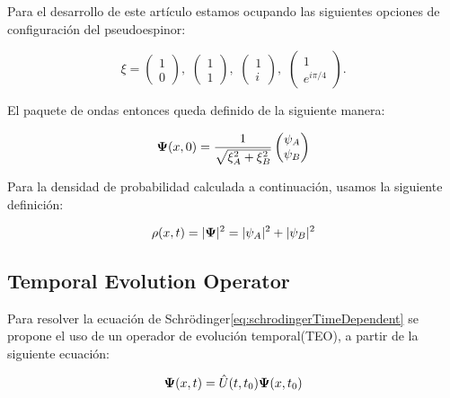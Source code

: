 Para el desarrollo de este artículo estamos ocupando las siguientes opciones de configuración del pseudoespinor:

\begin{equation}
    \label{eq:pseudospinorConfigurations}
    \xi=\begin{pmatrix}
            1\\0
    \end{pmatrix},\,\,\begin{pmatrix}
                          1\\1
    \end{pmatrix},\,\,\begin{pmatrix}
                          1\\i
    \end{pmatrix},\,\,\begin{pmatrix}
                          1\\e^{i\pi/4}
    \end{pmatrix}.
\end{equation}

El paquete de ondas entonces queda definido de la siguiente manera:

\begin{equation}
    \label{eq:FinalGWP}
    \mbox{\boldmath $\Psi$}(x,0)=\frac{1}{\sqrt {\xi_A^2 + \xi_B^2}}\begin{pmatrix}
                                                          \psi_A\\\psi_B
    \end{pmatrix}
\end{equation}

Para la densidad de probabilidad calculada a continuación, usamos la siguiente definición:

\begin{equation}
    \label{eq:probDens}
    \rho(x,t)=|\mbox{\boldmath $\Psi$}|^2 = |\psi_A|^2+|\psi_B|^2
\end{equation}

\subsection{Temporal Evolution Operator}\label{subsec:temporal-evolution-operator}
Para resolver la ecuación de Schrödinger\eqref{eq:schrodingerTimeDependent} se propone el uso de un operador de evolución temporal(TEO), a partir de la siguiente ecuación:

\begin{equation}
    \label{eq:TEOdifEq}
    \mbox{\boldmath $\Psi$}(x,t)=\hat{U}(t,t_0)\mbox{\boldmath $\Psi$}(x,t_0)
\end{equation}


